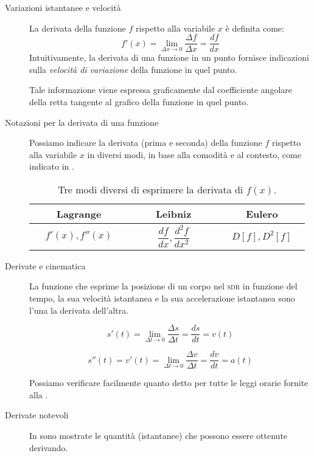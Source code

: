\documentclass[a4paper,11pt,italian]{article}
\begin{document}
\begin{description}
  \item[Variazioni istantanee e velocità]
  La derivata della funzione $ f $ rispetto alla variabile $ x $ è definita come:
  \[ f'(x) = \lim_{\Delta x \to 0} \frac{\Delta f}{\Delta x} = \frac{df}{dx} \]
  Intuitivamente, la derivata di una funzione in un punto fornisce indicazioni sulla \emph{velocità di variazione} della funzione in quel punto.
  
  Tale informazione viene espressa graficamente dal coefficiente angolare della retta tangente al grafico della funzione in quel punto.
  
  \item[Notazioni per la derivata di una funzione]
  Possiamo indicare la derivata (prima e seconda) della funzione $ f $ rispetto alla variabile $ x $ in diversi modi, in base alla comodità e al contesto, come indicato in .
  
  \begin{table}[htp]\centering
  \begin{tabular}{ccc}\toprule
    ~~~~\textbf{Lagrange}~~~~ & ~~~~\textbf{Leibniz}~~~~ & ~~~~\textbf{Eulero}~~~~ \\\midrule
    $ f'(x),f''(x) $ & $ \dfrac{df}{dx},\dfrac{d^2 f}{dx^2} $ & $ D[f], D^2[f] $ \\\bottomrule
  \end{tabular}
  \caption{Tre modi diversi di esprimere la derivata di $ f(x) $.}
  \label{tab:scritturaderivate}
  \end{table}
  
  \item[Derivate e cinematica]
  La funzione che esprime la posizione di un corpo nel \textsc{sdr} in funzione del tempo, la sua velocità istantanea e la sua accelerazione istantanea sono l'una la derivata dell'altra.
  
  \[ s'(t) = \displaystyle \lim_{\Delta t \to 0} \frac{\Delta s}{\Delta t} = \frac{ds}{dt} = v(t) \]
  
  \[ s''(t) = v'(t) = \displaystyle \lim_{\Delta t \to 0} \frac{\Delta v}{\Delta t} = \frac{dv}{dt} = a(t) \]
  
  Possiamo verificare facilmente quanto detto per tutte le leggi orarie fornite alla .
  
  \item[Derivate notevoli]
  In  sono mostrate le quantità (istantanee) che possono essere ottenute derivando.
  

\end{description}
\end{document}
